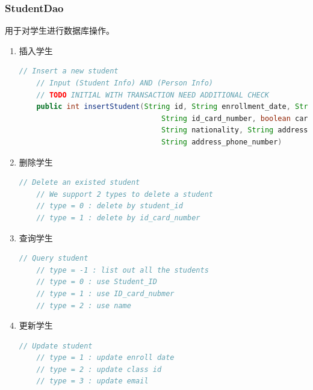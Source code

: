 \documentclass[../report.tex]{subfiles}
\begin{document}
\subsubsection{StudentDao}
用于对学生进行数据库操作。
\begin{enumerate}
\itemsep 0em
\item 插入学生\\
\begin{lstlisting}[language=java,backgroundcolor=\color{lightgray}]
    // Insert a new student
    // Input (Student Info) AND (Person Info)
    // TODO INITIAL WITH TRANSACTION NEED ADDITIONAL CHECK
    public int insertStudent(String id, String enrollment_date, String email, String class_id,
                                 String id_card_number, boolean card_type, String name, boolean gender, String birthdate,
                                 String nationality, String address, String address_postal_code,
                                 String address_phone_number)
\end{lstlisting}
\item 删除学生\\
\begin{lstlisting}[language=java,backgroundcolor=\color{lightgray}]
    // Delete an existed student
    // We support 2 types to delete a student
    // type = 0 : delete by student_id
    // type = 1 : delete by id_card_number
\end{lstlisting}
\item 查询学生\\
\begin{lstlisting}[language=java,backgroundcolor=\color{lightgray}]
    // Query student
    // type = -1 : list out all the students
    // type = 0 : use Student_ID
    // type = 1 : use ID_card_nubmer
    // type = 2 : use name
\end{lstlisting}
\item 更新学生\\
\begin{lstlisting}[language=java,backgroundcolor=\color{lightgray}]
    // Update student
    // type = 1 : update enroll date
    // type = 2 : update class id
    // type = 3 : update email
\end{lstlisting}
\end{enumerate}
\end{document}
